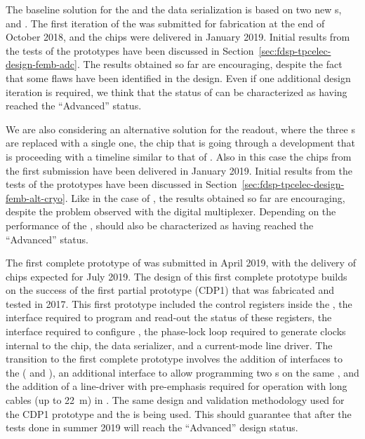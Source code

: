 The baseline solution for the  and the data serialization is based on two new 
s,  and .
The first iteration of the  was submitted for fabrication
at the end of October 2018, and the chips were delivered in January 2019.
Initial results from the tests of the  prototypes have
been discussed in Section~\ref{sec:fdsp-tpcelec-design-femb-adc}. The
results obtained so far are encouraging, despite the fact that some
flaws have been identified in the design. Even if one additional design
iteration is required, we think that the status of  can
be characterized as having reached the ``Advanced'' status.

We are also considering an alternative solution for the readout, where
the three s are replaced with a single one, the 
chip that is going through a development that is proceeding with a 
timeline similar to that of . Also in this case the
chips from the first submission have been delivered in January 2019.
Initial results from the tests of the  prototypes have
been discussed in Section~\ref{sec:fdsp-tpcelec-design-femb-alt-cryo}.
Like in the case of , the results obtained so far are
encouraging, despite the problem observed with the digital multiplexer.
Depending on the performance of the ,  should
also be characterized as having reached the ``Advanced'' status.

The first complete prototype of  was submitted in 
April 2019, with the delivery of chips expected for July 2019.
The design of this first complete prototype builds on the success of
the first partial prototype (CDP1) that was fabricated and tested in 2017.
This first prototype included the control registers inside the 
, the  interface required to program and read-out
the status of these registers, the  interface required to
configure , the phase-lock loop required to generate
clocks internal to the chip, the data serializer, and a current-mode
line driver. The transition to the first complete prototype
involves the addition of interfaces to the  (
and ), an additional  interface to allow programming two
 s on the same , and the
addition of a line-driver with pre-emphasis required for operation
with long cables (up to \SI{22}{m}) in \lar. The same design and
validation methodology used for the CDP1 prototype and the 
is being used. This should guarantee that after the tests done in
summer 2019  will reach the ``Advanced'' design 
status. 

